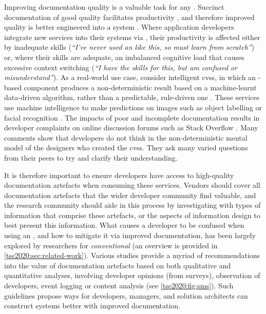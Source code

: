Improving  documentation quality is a valuable task for any . Succinct  documentation of good quality facilitates productivity \citep{Lethbridge:2005jv,myersstylos2016,7503516}, and therefore improved quality is better engineered into a system \citep{mcleod2011factors}. Where application developers integrate new services into their systems via , their productivity is affected either by inadequate skills (\textit{``I've never used an  like this, so must learn from scratch''}) or, where their skills are adequate, an imbalanced cognitive load that causes excessive context switching (\textit{``I have the skills for this, but am confused or misunderstand''}).
As a real-world use case, consider intelligent \glspl{cvs}, in which an -based component produces a non-deterministic result based on a machine-learnt data-driven algorithm, rather than a predictable, rule-driven one \citep{Cummaudo:2019icsme}. These services use machine intelligence to make predictions on images such as object labelling or facial recognition . The impacts of poor and incomplete documentation results in developer complaints on online discussion forums such as Stack Overflow \citep{Cummaudo:2020icse}. Many comments show that developers do not think in the non-deterministic mental model of the designers who created the \glspl{cvs}. They ask many varied questions from their peers to try and clarify their understanding.

It is therefore important to ensure developers have access to high-quality  documentation artefacts when consuming these services. Vendors should cover all documentation artefacts that the wider developer community find valuable, and the research community should aide in this process by investigating with types of information that comprise these artefacts, or the aspects of information design to best present this information.
What causes a developer to be confused when using an , and how to mitigate it via improved documentation, has been largely explored by researchers for \textit{conventional}  (an overview is provided in \cref{tse2020:sec:related-work}). Various studies provide a myriad of recommendations into the value of  documentation artefacts based on both qualitative and quantitative analyses, involving developer opinions (from surveys), observation of developers, event logging or content analysis (see \cref{tse2020:fig:sms}). Such guidelines propose ways for developers, managers, and solution architects can construct systems better with improved documentation.

